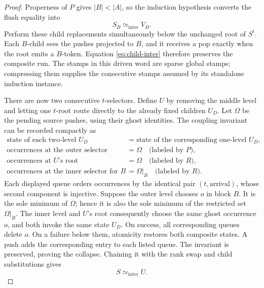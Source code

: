 \documentclass[11pt]{article}
\theoremstyle{definition}
\newcommand{\intereq}{\simeq_{\mathrm{inter}}}
\begin{document}
\begin{proof}
Properness of \(P\) gives \(|B|<|A|\), so the induction hypothesis converts
the flush equality into
\begin{equation}
  S_B\intereq V_B.
  \tag{17}\label{eq:child-inter}
\end{equation}
Perform these child replacements simultaneously below the unchanged root
of \(S^t\).  Each \(B\)-child sees the pushes projected to \(B\), and it
receives a pop exactly when the root emits a \(B\)-token.  Equation
\eqref{eq:child-inter} therefore preserves the composite run.  The stamps
in this driven word are sparse global stamps; compressing them supplies the
consecutive stamps assumed by its standalone induction instance.

There are now two consecutive \(t\)-selectors.  Define \(U\) by removing
the middle level and letting one \(t\)-root route directly to the already
fixed children \(U_D\).  Let \(\Omega\) be the pending source pushes, using
their ghost identities.  The coupling invariant can be recorded compactly
as
\[
\begin{aligned}
 \text{state of each two-level }U_D
   &=\text{state of the corresponding one-level }U_D,\\
 \text{occurrences at the outer selector}
   &=\Omega\quad\text{(labeled by \(P\))},\\
 \text{occurrences at \(U\)'s root}
   &=\Omega\quad\text{(labeled by \(R\))},\\
 \text{occurrences at the inner selector for \(B\)}
   &=\Omega|_B\quad\text{(labeled by \(R\))}.
\end{aligned}
\]
Each displayed queue orders occurrences by the identical pair
\((t,\text{arrival})\), whose second component is injective.  Suppose the
outer level chooses \(o\) in block \(B\).  It is the sole minimum of
\(\Omega\); hence it is also the sole minimum of the restricted set
\(\Omega|_B\).  The inner level and \(U\)'s root consequently choose the
same ghost occurrence \(o\), and both invoke the same state \(U_D\).  On
success, all corresponding queues delete \(o\).  On a failure below them,
atomicity restores both composite states.  A push adds the corresponding
entry to each listed queue.  The invariant is preserved, proving the
collapse.  Chaining it with the rank swap and child substitutions gives
\begin{equation}
  S\intereq U.
  \tag{18}\label{eq:S-U}
\end{equation}


\end{proof}
\end{document}
